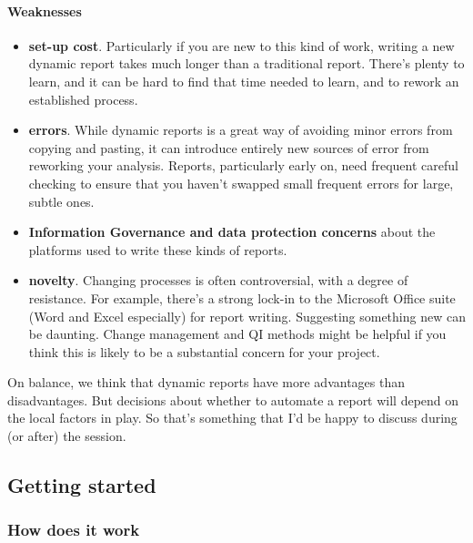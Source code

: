 \documentclass[
]{article}
\providecommand{\tightlist}{%
  \setlength{\itemsep}{0pt}\setlength{\parskip}{0pt}}
\begin{document}
\hypertarget{weaknesses}{%
\paragraph{Weaknesses}\label{weaknesses}}

\begin{itemize}
\tightlist
\item
  \textbf{set-up cost}. Particularly if you are new to this kind of
  work, writing a new dynamic report takes much longer than a
  traditional report. There's plenty to learn, and it can be hard to
  find that time needed to learn, and to rework an established process.
\item
  \textbf{errors}. While dynamic reports is a great way of avoiding
  minor errors from copying and pasting, it can introduce entirely new
  sources of error from reworking your analysis. Reports, particularly
  early on, need frequent careful checking to ensure that you haven't
  swapped small frequent errors for large, subtle ones.
\item
  \textbf{Information Governance and data protection concerns} about the
  platforms used to write these kinds of reports.
\item
  \textbf{novelty}. Changing processes is often controversial, with a
  degree of resistance. For example, there's a strong lock-in to the
  Microsoft Office suite (Word and Excel especially) for report writing.
  Suggesting something new can be daunting. Change management and QI
  methods might be helpful if you think this is likely to be a
  substantial concern for your project.
\end{itemize}

On balance, we think that dynamic reports have more advantages than
disadvantages. But decisions about whether to automate a report will
depend on the local factors in play. So that's something that I'd be
happy to discuss during (or after) the session.

\hypertarget{getting-started}{%
\subsection{Getting started}\label{getting-started}}

\hypertarget{how-does-it-work}{%
\subsubsection{How does it work}\label{how-does-it-work}}
\end{document}
